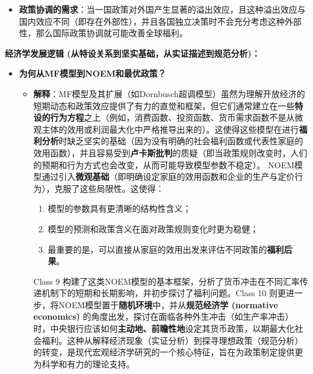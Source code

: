 \documentclass[12pt]{article}
\begin{document}
\begin{itemize}
\begin{itemize}
        \item \textbf{政策协调的需求}：当一国政策对外国产生显著的溢出效应，且这种溢出效应与国内效应不同（即存在外部性），并且各国独立决策时不会充分考虑这种外部性，那么国际政策协调就可能改善全球福利。
    \end{itemize}
\end{itemize}

\textbf{经济学发展逻辑 (从特设关系到坚实基础，从实证描述到规范分析)：}
\begin{itemize}
    \item \textbf{为何从MF模型到NOEM和最优政策？}
    \begin{itemize}
        \item \textbf{解释}：MF模型及其扩展（如Dornbusch超调模型）虽然为理解开放经济的短期动态和政策效应提供了有力的直觉和框架，但它们通常建立在一些\textbf{特设的行为方程}之上（例如，消费函数、投资函数、货币需求函数不是从微观主体的效用或利润最大化中严格推导出来的）。这使得这些模型在进行\textbf{福利分析}时缺乏坚实的基础（因为没有明确的社会福利函数或代表性家庭的效用函数），并且容易受到\textbf{卢卡斯批判}的质疑（即当政策规则改变时，人们的预期和行为方式也会改变，从而可能导致模型参数不稳定）。
        NOEM模型通过引入\textbf{微观基础}（即明确设定家庭的效用函数和企业的生产与定价行为），克服了这些局限性。这使得：
        \begin{enumerate}
            \item 模型的参数具有更清晰的结构性含义；
            \item 模型的预测和政策含义在面对政策规则变化时更为稳健；
            \item 最重要的是，可以直接从家庭的效用出发来评估不同政策的\textbf{福利后果}。
        \end{enumerate}
        Class 9 构建了这类NOEM模型的基本框架，分析了货币冲击在不同汇率传递机制下的短期和长期影响，并初步探讨了福利问题。Class 10 则更进一步，将NOEM模型置于\textbf{随机环境}中，并从\textbf{规范经济学 (normative economics)} 的角度出发，探讨在面临各种外生冲击（如生产率冲击）时，中央银行应该如何\textbf{主动地、前瞻性地}设定其货币政策，以期最大化社会福利。这种从解释经济现象（实证分析）到探寻理想政策（规范分析）的转变，是现代宏观经济学研究的一个核心特征，旨在为政策制定提供更为科学和有力的理论支持。
    \end{itemize}
\end{itemize}
\end{document}
